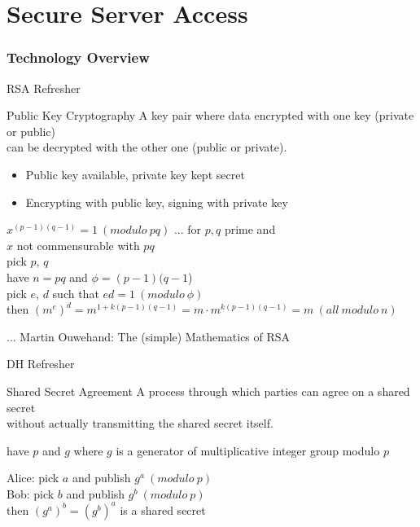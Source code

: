 \part{Secure Server Access}


\section{Technology Overview}


\begin{frame}{RSA Refresher}
    \begin{block}{Public Key Cryptography}
        A key pair where data encrypted with one key (private or public) \\
        can be decrypted with the other one (public or private).
        \begin{itemize}
            \item Public key available, private key kept secret
            \item Encrypting with public key, signing with private key
        \end{itemize}
    \end{block}

    \bigskip

    $x^{(p-1)(q-1)} = 1 ~ (modulo ~ pq)$ \hfill ... for $p, q$ prime and \\ \hfill $x$ not commensurable with $pq$ \\
    pick $p$, $q$ \\
    have $n = pq$ and $\phi = (p-1)(q-1$) \\
    pick $e$, $d$ such that $ed = 1 ~ (modulo ~ \phi)$ \\
    then $(m^e)^d = m^{1+k(p-1)(q-1)} = m \cdot m^{k(p-1)(q-1)} = m ~ (all ~ modulo ~ n)$ \\

    \bigskip

    \hfill ... Martin Ouwehand: The (simple) Mathematics of RSA
\end{frame}


\begin{frame}{DH Refresher}
    \begin{block}{Shared Secret Agreement}
        A process through which parties can agree on a shared secret \\
        without actually transmitting the shared secret itself.
    \end{block}

    \bigskip

    have $p$ and $g$ where $g$ is a generator of multiplicative integer group modulo $p$ \\

    \bigskip

    Alice: pick $a$ and publish $g^a ~ (modulo ~ p)$ \\
    Bob: pick $b$ and publish $g^b ~ (modulo ~ p)$ \\

    then $(g^a)^b = (g^b)^a$ is a shared secret \\ 

\end{frame}



